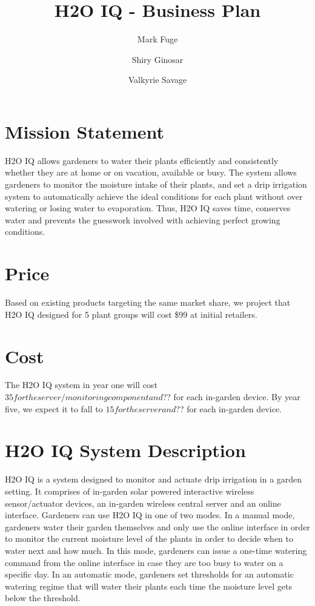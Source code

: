 \documentclass[11pt]{article}
\begin{document}
\title{H2O IQ - Business Plan}
\author{Mark Fuge \and Shiry Ginosar \and Valkyrie Savage}

\maketitle

\section{Mission Statement}

H2O IQ allows gardeners to water their plants efficiently and consistently whether they are at home or on vacation, available or busy. The system allows gardeners to monitor the moisture intake of their plants, and set a drip irrigation system to automatically achieve the ideal conditions for each plant without over watering or losing water to evaporation. Thus, H2O IQ saves time, conserves water and prevents the guesswork involved with achieving perfect growing conditions.

\section{Price}

Based on existing products targeting the same market share, we project that H2O IQ designed for 5 plant groups will cost \$99 at initial retailers. 

\section{Cost}

The H2O IQ system in year one will cost $35 for the server/monitoring component and $?? for each in-garden device.  By year five, we expect it to fall to $15 for the server and $?? for each in-garden device.

\section{H2O IQ System Description}

H2O IQ is a system designed to monitor and actuate drip irrigation in a garden setting. It comprises of in-garden solar powered interactive wireless sensor/actuator devices, an in-garden wireless central server and an online interface. Gardeners can use H2O IQ in one of two modes. In a manual mode, gardeners water their garden themselves and only use the online interface in order to monitor the current moisture level of the plants in order to decide when to water next and how much. In this mode, gardeners can issue a one-time watering command from the online interface in case they are too busy to water on a specific day. In an automatic mode, gardeners set thresholds for an automatic watering regime that will water their plants each time the moisture level gets below the threshold.
\end{document}
